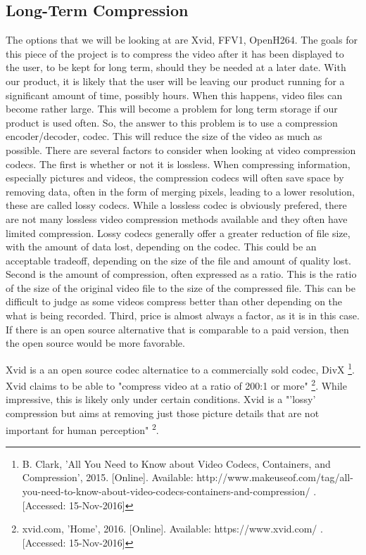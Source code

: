 \documentclass[letterpaper,10pt,onecolumn,draftclsnofoot]{IEEEtran}
\begin{document}
\newpage
\subsection{Long-Term Compression} %

The options that we will be looking at are Xvid, FFV1, OpenH264.
The goals for this piece of the project is to compress the video after it has been displayed to the user, to be kept for long term, should they be needed at a later date.
With our product, it is likely that the user will be leaving our product running for a significant amount of time, possibly hours.
When this happens, video files can become rather large.
This will become a problem for long term storage if our product is used often.
So, the answer to this problem is to use a compression encoder/decoder, codec.
This will reduce the size of the video as much as possible.
There are several factors to consider when looking at video compression codecs.
The first is whether or not it is lossless.
When compressing information, especially pictures and videos, the compression codecs will often save space by removing data, often in the form of merging pixels, leading to a lower resolution, these are called lossy codecs.
While a lossless codec is obviously prefered, there are not many lossless video compression methods available and they often have limited compression.
Lossy codecs generally offer a greater reduction of file size, with the amount of data lost, depending on the codec.
This could be an acceptable tradeoff, depending on the size of the file and amount of quality lost.
Second is the amount of compression, often expressed as a ratio.
This is the ratio of the size of the original video file to the size of the compressed file.
This can be difficult to judge as some videos compress better than other depending on the what is being recorded.
Third, price is almost always a factor, as it is in this case.
If there is an open source alternative that is comparable to a paid version, then the open source would be more favorable.

Xvid is a an open source codec alternatice to a commercially sold codec, DivX \footnote{B. Clark, 'All You Need to Know about Video Codecs, Containers, and Compression', 2015. [Online]. Available: http://www.makeuseof.com/tag/all-you-need-to-know-about-video-codecs-containers-and-compression/ . [Accessed: 15-Nov-2016] }. %
Xvid claims to be able to "compress video at a ratio of 200:1 or more" \footnote{xvid.com, 'Home', 2016. [Online]. Available: https://www.xvid.com/ . [Accessed: 15-Nov-2016] }. %
While impressive, this is likely only under certain conditions.
Xvid is a "'lossy' compression but aims at removing just those picture details that are not important for human perception" \textsuperscript{2}. %
\end{document}
